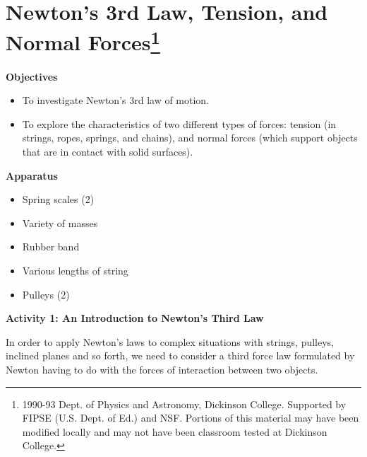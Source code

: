 
\section{Newton's 3rd Law, Tension, and Normal Forces\footnote{
1990-93 Dept. of Physics and Astronomy, Dickinson College. Supported by FIPSE
(U.S. Dept. of Ed.) and NSF. Portions of this material may have been modified
locally and may not have been classroom tested at Dickinson College.
}}

\makelabheader %

\bigskip
\textbf{Objectives }

\begin{itemize}
\item To investigate Newton's 3rd law of motion. 
\item To explore the characteristics of two different types of forces: tension
(in strings, ropes, springs, and chains), and normal forces (which support objects
that are in contact with solid surfaces).
\end{itemize}

\textbf{Apparatus} 

\begin{itemize} [nosep]
\item Spring scales (2) 
\item Variety of masses 
\item Rubber band 
\item Various lengths of string 
\item Pulleys (2)
\end{itemize}

\medskip
\textbf{Activity 1: An Introduction to Newton's Third Law }

In order to apply Newton's laws to complex situations with strings, pulleys,
inclined planes and so forth, we need to consider a third force law formulated
by Newton having to do with the forces of interaction between two objects. 



